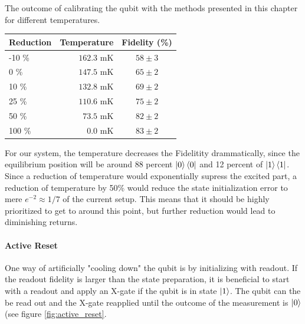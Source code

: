 \begin{margintable}
\centering
\caption{The outcome of calibrating the qubit with the methods presented in this chapter for different temperatures.}
\vspace{0.3 cm}
\begin{tabular}{lr|c}
\hline
\textbf{Reduction}        & Temperature                  & Fidelity (\%)\\ \hline
-10 \%                    &  $162.3 $ mK       &  $58 \pm 3$\\
0   \%                    &  $147.5 $ mK       &  $65 \pm 2$\\
10  \%                    &  $132.8 $ mK       &  $69 \pm 2$\\
25  \%                    &  $110.6 $ mK       &  $75 \pm 2$\\
50  \%                    &  $\; 73.5$  mK     &  $82 \pm 2$\\
100 \%                    &  $\;\; 0.0$  mK    &  $83 \pm 2$\\
\end{tabular}
\label{tab:temperature_contribution_estimation}
\end{margintable}
For our system, the temperature decreases the Fidelitity drammatically, since the equilibrium position will be around 88 percent $\ket{0}\bra{0}$ and 12 percent of $\ket{1}\bra{1}$. Since a reduction of temperature would exponentially supress the excited part, a reduction of temperature by 50\% would reduce the state initialization error to mere $e^{-2}\approx 1/7$ of the current setup. This means that it should be highly prioritized to get to around this point, but further reduction  would lead to diminishing returns.

\paragraph{Active Reset} One way of artificially "cooling down" the qubit is by initializing with readout. If the readout fidelity is larger than the state preparation, it is beneficial to start with a readout and apply an X-gate if the qubit is in state $\ket{1}$. The qubit can the be read out and the X-gate reapplied until the outcome of the measurement is $\ket{0}$ (see figure \ref{fig:active_reset}.

